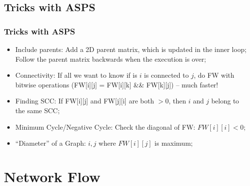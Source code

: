 \subsection{Tricks with ASPS}
\begin{frame}
  \frametitle{Tricks with ASPS}

  \begin{itemize}
  \item Include parents: Add a 2D parent matrix, which is updated in
    the inner loop; Follow the parent matrix backwards when the
    execution is over;
  \item Connectivity: If all we want to know if is $i$ is connected to
    $j$, do FW with bitwise operations (FW[i][j] = FW[i][k] \&\&
    FW[k][j]) -- much faster!
  \item Finding SCC: If FW[i][j] and FW[j][i] are both $> 0$, then $i$
    and $j$ belong to the same SCC;
  \item Minimum Cycle/Negative Cycle: Check the diagonal of FW:
    $FW[i][i] < 0$;
  \item ``Diameter'' of a Graph: $i,j$ where $FW[i][j]$ is maximum;
  \end{itemize}
\end{frame}

\section{Network Flow}
